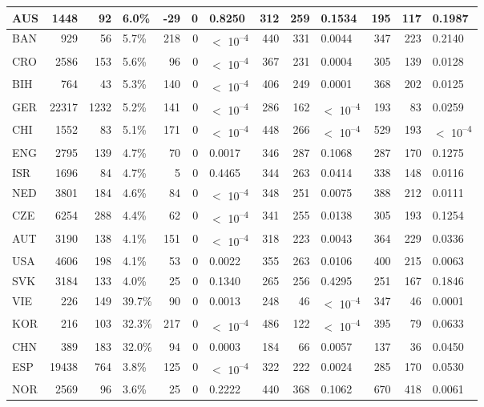 \begin{tabular}{l|r|r|l|r|r|l|r|r|l|r|r|l}
\hline
AUS & 1448 & 92 & 6.0\% & -29 & 0 & 0.8250 & 312 & 259 & 0.1534 & 195 & 117 & 0.1987\\
\hline
BAN & 929 & 56 & 5.7\% & 218 & 0 & $<$ 10\textsuperscript{--4} & 440 & 331 & 0.0044 & 347 & 223 & 0.2140\\
\hline
CRO & 2586 & 153 & 5.6\% & 96 & 0 & $<$ 10\textsuperscript{--4} & 367 & 231 & 0.0004 & 305 & 139 & 0.0128\\
\hline
BIH & 764 & 43 & 5.3\% & 140 & 0 & $<$ 10\textsuperscript{--4} & 406 & 249 & 0.0001 & 368 & 202 & 0.0125\\
\hline
GER & 22317 & 1232 & 5.2\% & 141 & 0 & $<$ 10\textsuperscript{--4} & 286 & 162 & $<$ 10\textsuperscript{--4} & 193 & 83 & 0.0259\\
\hline
CHI & 1552 & 83 & 5.1\% & 171 & 0 & $<$ 10\textsuperscript{--4} & 448 & 266 & $<$ 10\textsuperscript{--4} & 529 & 193 & $<$ 10\textsuperscript{--4}\\
\hline
ENG & 2795 & 139 & 4.7\% & 70 & 0 & 0.0017 & 346 & 287 & 0.1068 & 287 & 170 & 0.1275\\
\hline
ISR & 1696 & 84 & 4.7\% & 5 & 0 & 0.4465 & 344 & 263 & 0.0414 & 338 & 148 & 0.0116\\
\hline
NED & 3801 & 184 & 4.6\% & 84 & 0 & $<$ 10\textsuperscript{--4} & 348 & 251 & 0.0075 & 388 & 212 & 0.0111\\
\hline
CZE & 6254 & 288 & 4.4\% & 62 & 0 & $<$ 10\textsuperscript{--4} & 341 & 255 & 0.0138 & 305 & 193 & 0.1254\\
\hline
AUT & 3190 & 138 & 4.1\% & 151 & 0 & $<$ 10\textsuperscript{--4} & 318 & 223 & 0.0043 & 364 & 229 & 0.0336\\
\hline
USA & 4606 & 198 & 4.1\% & 53 & 0 & 0.0022 & 355 & 263 & 0.0106 & 400 & 215 & 0.0063\\
\hline
SVK & 3184 & 133 & 4.0\% & 25 & 0 & 0.1340 & 265 & 256 & 0.4295 & 251 & 167 & 0.1846\\
\hline
VIE & 226 & 149 & 39.7\% & 90 & 0 & 0.0013 & 248 & 46 & $<$ 10\textsuperscript{--4} & 347 & 46 & 0.0001\\
\hline
KOR & 216 & 103 & 32.3\% & 217 & 0 & $<$ 10\textsuperscript{--4} & 486 & 122 & $<$ 10\textsuperscript{--4} & 395 & 79 & 0.0633\\
\hline
CHN & 389 & 183 & 32.0\% & 94 & 0 & 0.0003 & 184 & 66 & 0.0057 & 137 & 36 & 0.0450\\
\hline
ESP & 19438 & 764 & 3.8\% & 125 & 0 & $<$ 10\textsuperscript{--4} & 322 & 222 & 0.0024 & 285 & 170 & 0.0530\\
\hline
NOR & 2569 & 96 & 3.6\% & 25 & 0 & 0.2222 & 440 & 368 & 0.1062 & 670 & 418 & 0.0061\\

\end{tabular}

